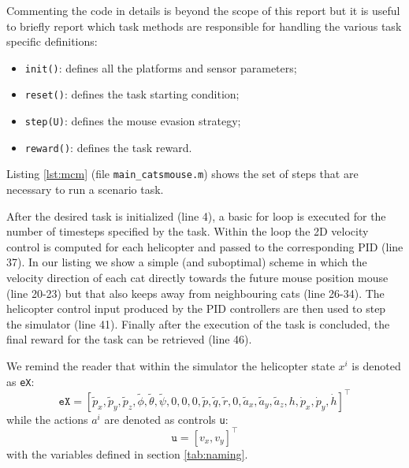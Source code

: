 \documentclass[a4paper,11pt]{report}
\newcommand\mytexttt[1]{\texttt{\hyphenchar\font=45\relax #1}}
\begin{document}
Commenting the code in details is beyond the scope of this report but it is useful to briefly report which task methods are responsible for handling the various task specific definitions:
\begin{itemize}
\item\mytexttt{init()}: defines all the platforms and sensor parameters;
\item\mytexttt{reset()}: defines the task starting condition;
\item\mytexttt{step(U)}: defines the mouse evasion strategy;
\item\mytexttt{reward()}: defines the task reward.
\end{itemize}

Listing \ref{lst:mcm} (file \texttt{main\_catsmouse.m}) shows the set of steps that are necessary to run a scenario task.

After the desired task is initialized (line 4), a basic for loop is executed for the number of timesteps specified by the task. Within the loop the 2D velocity control is computed for each helicopter and passed to the corresponding PID (line 37). 
In our listing we show a simple (and suboptimal) scheme in which the velocity direction of each cat directly towards the future mouse position mouse (line 20-23) but that also keeps away from neighbouring cats (line 26-34). 
The helicopter control input produced by the PID controllers are then used to step the simulator (line 41).
Finally after the execution of the task is concluded, the final reward for the task can be retrieved (line 46).

We remind the reader that within the simulator the helicopter state $x^i$ is denoted as \texttt{eX}:
$$\texttt{eX} = [\tilde{p}_x,\tilde{p}_y,\tilde{p}_z,\tilde{\phi},\tilde{\theta},\tilde{\psi},0,0,0,\tilde{p},\tilde{q},\tilde{r},0,\tilde{a}_x,\tilde{a}_y,\tilde{a}_z,h,\dot{p}_x,\dot{p}_y,\dot{h}]^\intercal$$
while the actions $a^i$ are denoted as controls \texttt{u}:
$$\texttt{u}=[v_x,v_y]^\intercal$$
with the variables defined in section \ref{tab:naming}.
\end{document}
